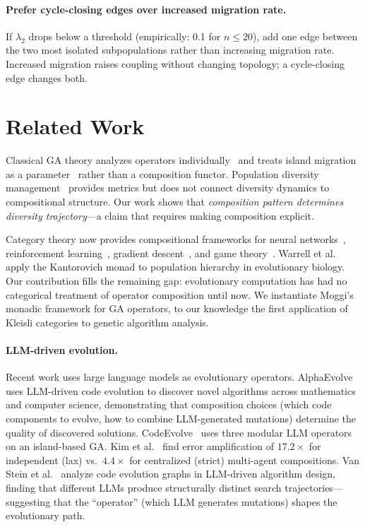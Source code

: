 \documentclass[dvipsnames,format=sigconf,anonymous=false,review=false]{acmart}
\begin{document}
\paragraph{Prefer cycle-closing edges over increased migration rate.} If $\lambda_2$ drops below a threshold (empirically: 0.1 for $n \leq 20$), add one edge between the two most isolated subpopulations rather than increasing migration rate. Increased migration raises coupling without changing topology; a cycle-closing edge changes both.

\section{Related Work}

Classical GA theory analyzes operators individually~\cite{holland1975adaptation, goldberg1989genetic, mitchell1992royal} and treats island migration as a parameter~\cite{whitley1999island, skolicki2005influence} rather than a composition functor. Population diversity management~\cite{burke2004diversity, crepinsek2013exploration} provides metrics but does not connect diversity dynamics to compositional structure. Our work shows that \emph{composition pattern determines diversity trajectory}---a claim that requires making composition explicit.

Category theory now provides compositional frameworks for neural networks~\cite{gavranovic2024categorical}, reinforcement learning~\cite{bakirtzis2024compositional, hedges2024reinforcement}, gradient descent~\cite{hanks2024gradient}, and game theory~\cite{ghani2025approximate}. Warrell et al.~\cite{warrell2024kantorovich} apply the Kantorovich monad to population hierarchy in evolutionary biology. Our contribution fills the remaining gap: evolutionary computation has had no categorical treatment of operator composition until now. We instantiate Moggi's~\cite{moggi1991notions} monadic framework for GA operators, to our knowledge the first application of Kleisli categories to genetic algorithm analysis.

\paragraph{LLM-driven evolution.}
Recent work uses large language models as evolutionary operators. AlphaEvolve~\cite{alphaevolve2025} uses LLM-driven code evolution to discover novel algorithms across mathematics and computer science, demonstrating that composition choices (which code components to evolve, how to combine LLM-generated mutations) determine the quality of discovered solutions. CodeEvolve~\cite{assumpcao2025codeevolve} uses three modular LLM operators on an island-based GA. Kim et al.~\cite{kim2025scaling} find error amplification of $17.2\times$ for independent (lax) vs.\ $4.4\times$ for centralized (strict) multi-agent compositions. Van Stein et al.~\cite{vanstein2025code} analyze code evolution graphs in LLM-driven algorithm design, finding that different LLMs produce structurally distinct search trajectories---suggesting that the ``operator'' (which LLM generates mutations) shapes the evolutionary path.
\end{document}
